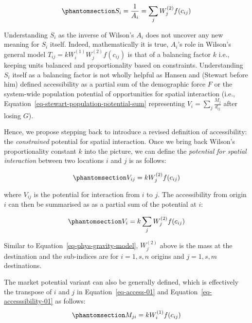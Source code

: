 \documentclass[
]{article}
\begin{document}
\begin{equation}\phantomsection\label{eq-Ai-as-accessibility}{
S_i = \frac{1}{A_i} = \sum_j W_j^{(2)} f(c_{ij})
}\end{equation}

Understanding \(S_i\) as the inverse of Wilson's \(A_i\) does not
uncover any new meaning for \(S_i\) itself. Indeed, mathematically it is
true, \(A_i\)'s role in Wilson's general model
\(T_{ij} = k W_i^{(1)} W_j^{(2)} f(c_{ij})\) is that of a balancing
factor \(k\) i.e., keeping units balanced and proportionality based on
constraints. Understanding \(S_i\) itself as a balancing factor is not
wholly helpful as Hansen and (Stewart before him) defined accessibility
as a partial sum of the demographic force \(F\) or the system-wide
population potential of opportunities for spatial interaction (i.e.,
Equation~\ref{eq-stewart-population-potential-sum} representing
\(V_i = \sum_j \frac{M_j}{d_{ij}}\) after losing \(G\)).

Hence, we propose stepping back to introduce a revised definition of
accessibility: the \emph{constrained} potential for spatial interaction.
Once we bring back Wilson's proportionality constant \(k\) into the
picture, we can define the \emph{potential for spatial interaction}
between two locations \(i\) and \(j\) is as follows:

\begin{equation}\phantomsection\label{eq-access-01}{
V_{ij} = k W_j^{(2)} f(c_{ij})
}\end{equation}

\noindent where \(V_{ij}\) is the potential for interaction from \(i\)
to \(j\). The accessibility from origin \(i\) can then be summarised as
as a partial sum of the potential at \(i\):

\begin{equation}\phantomsection\label{eq-accesssibility-01}{
V_{i} = k \sum_j W_j^{(2)} f(c_{ij})
}\end{equation}

Similar to Equation~\ref{eq-phys-gravity-model}, \(W_j^{(2)}\) above is
the mass at the destination and the sub-indices are for \(i = 1,s, n\)
origins and \(j = 1,s, m\) destinations.

The market potential variant can also be generally defined, which is
effectively the transpose of \(i\) and \(j\) in
Equation~\ref{eq-access-01} and Equation~\ref{eq-accesssibility-01} as
follows: \begin{equation}\phantomsection\label{eq-market-01}{
M_{ji} = k W_i^{(1)} f(c_{ij})
}\end{equation}
\end{document}

